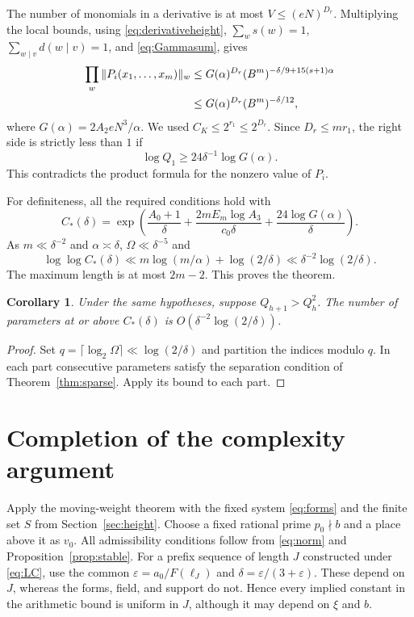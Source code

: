 \documentclass[11pt]{article}
\numberwithin{equation}{section}
\newtheorem{corollary}[theorem]{Corollary}
\theoremstyle{remark}\newtheorem{remark}[theorem]{Remark}
\newcommand{\eps}{\varepsilon}\newcommand{\LL}{\mathcal L}
\begin{document}
The number of monomials in a derivative is at most
$V\le(eN)^{D_r}$. Multiplying the local bounds, using
\eqref{eq:derivativeheight}, $\sum_ws(w)=1$,
$\sum_{w\mid v}d(w\mid v)=1$, and \eqref{eq:Gammasum}, gives
\begin{align}
 \prod_w\|P_i(x_1,\ldots,x_m)\|_w
 &\le G(\alpha)^{D_r}
       (B^m)^{-\delta/9+15(s+1)\alpha}\notag\\
 &\le G(\alpha)^{D_r}(B^m)^{-\delta/12},\label{eq:product}
\end{align}
where $G(\alpha)=2A_2eN^3/\alpha$. We used
$C_K\le2^{r_1}\le2^{D_r}$.
Since $D_r\le mr_1$, the right side is strictly less than $1$ if
\begin{equation}\label{eq:cutofftwo}
 \log Q_1\ge24\delta^{-1}\log G(\alpha).
\end{equation}
This contradicts the product formula for the nonzero value of $P_i$.

For definiteness, all the required conditions hold with
\begin{equation}\label{eq:explicitcutoff}
 C_*(\delta)=\exp\left(
 \frac{A_0+1}{\delta}
 +\frac{2mE_m\log A_3}{c_0\delta}
 +\frac{24\log G(\alpha)}{\delta}\right).
\end{equation}
As $m\ll\delta^{-2}$ and $\alpha\asymp\delta$,
$\Omega\ll\delta^{-5}$ and
\[
 \log\log C_*(\delta)
 \ll m\log(m/\alpha)+\log(2/\delta)
 \ll\delta^{-2}\log(2/\delta).
\]
The maximum length is at most $2m-2$. This proves the theorem.

\begin{corollary}\label{cor:count}
Under the same hypotheses, suppose $Q_{h+1}>Q_h^2$.
The number of parameters at or above $C_*(\delta)$ is
$O(\delta^{-2}\log(2/\delta))$.
\end{corollary}
\begin{proof}
Set $q=\lceil\log_2\Omega\rceil\ll\log(2/\delta)$ and partition the
indices modulo $q$. In each part consecutive parameters satisfy the
separation condition of Theorem~\ref{thm:sparse}. Apply its bound to
each part.
\end{proof}

\section{Completion of the complexity argument}\label{sec:completion}
Apply the moving-weight theorem with the fixed system \eqref{eq:forms}
and the finite set $S$ from Section~\ref{sec:height}.
Choose a fixed rational prime $p_0\nmid b$ and a place above it as $v_0$.
All admissibility conditions follow from \eqref{eq:norm} and
Proposition~\ref{prop:stable}.
For a prefix sequence of length $J$ constructed under \eqref{eq:LC},
use the common $\eps=a_0/F(\ell_J)$ and
$\delta=\eps/(3+\eps)$. These depend on $J$, whereas the forms, field,
and support do not. Hence every implied constant in the arithmetic
bound is uniform in $J$, although it may depend on $\xi$ and $b$.
\end{document}
